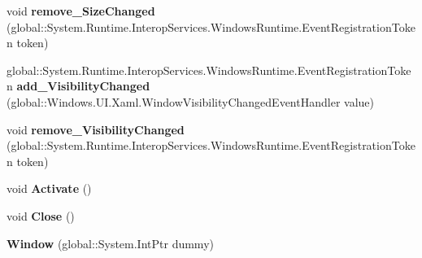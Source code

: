 \begin{DoxyCompactItemize}
void {\bfseries remove\+\_\+\+Size\+Changed} (global\+::\+System.\+Runtime.\+Interop\+Services.\+Windows\+Runtime.\+Event\+Registration\+Token token)
\item 
\mbox{\label{class_windows_1_1_u_i_1_1_xaml_1_1_window_afb2f2c85c54f1a082f2cdb9cac5b875c}} 
global\+::\+System.\+Runtime.\+Interop\+Services.\+Windows\+Runtime.\+Event\+Registration\+Token {\bfseries add\+\_\+\+Visibility\+Changed} (global\+::\+Windows.\+U\+I.\+Xaml.\+Window\+Visibility\+Changed\+Event\+Handler value)
\item 
\mbox{\label{class_windows_1_1_u_i_1_1_xaml_1_1_window_ad984391809f48d0412161ff575cd570d}} 
void {\bfseries remove\+\_\+\+Visibility\+Changed} (global\+::\+System.\+Runtime.\+Interop\+Services.\+Windows\+Runtime.\+Event\+Registration\+Token token)
\item 
\mbox{\label{class_windows_1_1_u_i_1_1_xaml_1_1_window_a92d7288cb5bc807e56222e347e2e7603}} 
void {\bfseries Activate} ()
\item 
\mbox{\label{class_windows_1_1_u_i_1_1_xaml_1_1_window_ab6b6a8e512a08f5ba35b8bc367dfeea8}} 
void {\bfseries Close} ()
\item 
\mbox{\label{class_windows_1_1_u_i_1_1_xaml_1_1_window_a2f884c667c9bd45a983c8611d71c365b}} 
{\bfseries Window} (global\+::\+System.\+Int\+Ptr dummy)
\end{DoxyCompactItemize}
